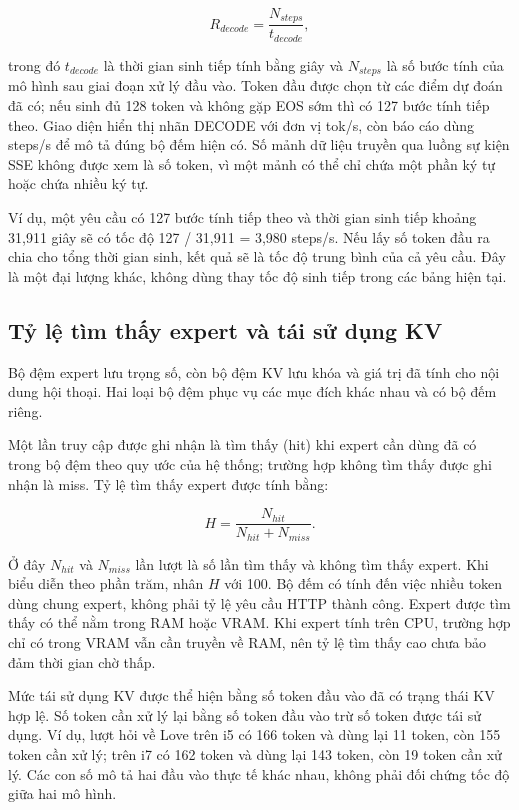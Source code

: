 \begin{equation}
\label{eq:2.11}
R_{decode}=\frac{N_{steps}}{t_{decode}},
\end{equation}

trong đó $t_{decode}$ là thời gian sinh tiếp tính bằng giây và $N_{steps}$ là số bước tính của mô hình sau giai đoạn xử lý đầu vào. Token đầu được chọn từ các điểm dự đoán đã có; nếu sinh đủ 128 token và không gặp EOS sớm thì có 127 bước tính tiếp theo. Giao diện hiển thị nhãn DECODE với đơn vị tok/s, còn báo cáo dùng steps/s để mô tả đúng bộ đếm hiện có. Số mảnh dữ liệu truyền qua luồng sự kiện SSE không được xem là số token, vì một mảnh có thể chỉ chứa một phần ký tự hoặc chứa nhiều ký tự.

Ví dụ, một yêu cầu có 127 bước tính tiếp theo và thời gian sinh tiếp khoảng 31,911 giây sẽ có tốc độ 127 / 31,911 = 3,980 steps/s. Nếu lấy số token đầu ra chia cho tổng thời gian sinh, kết quả sẽ là tốc độ trung bình của cả yêu cầu. Đây là một đại lượng khác, không dùng thay tốc độ sinh tiếp trong các bảng hiện tại.

\subsection{Tỷ lệ tìm thấy expert và tái sử dụng KV}

Bộ đệm expert lưu trọng số, còn bộ đệm KV lưu khóa và giá trị đã tính cho nội dung hội thoại. Hai loại bộ đệm phục vụ các mục đích khác nhau và có bộ đếm riêng.

Một lần truy cập được ghi nhận là tìm thấy (hit) khi expert cần dùng đã có trong bộ đệm theo quy ước của hệ thống; trường hợp không tìm thấy được ghi nhận là miss. Tỷ lệ tìm thấy expert được tính bằng:

\begin{equation}
\label{eq:2.12}
H=\frac{N_{hit}}{N_{hit}+N_{miss}}.
\end{equation}

Ở đây $N_{hit}$ và $N_{miss}$ lần lượt là số lần tìm thấy và không tìm thấy expert. Khi biểu diễn theo phần trăm, nhân $H$ với 100. Bộ đếm có tính đến việc nhiều token dùng chung expert, không phải tỷ lệ yêu cầu HTTP thành công. Expert được tìm thấy có thể nằm trong RAM hoặc VRAM. Khi expert tính trên CPU, trường hợp chỉ có trong VRAM vẫn cần truyền về RAM, nên tỷ lệ tìm thấy cao chưa bảo đảm thời gian chờ thấp.

Mức tái sử dụng KV được thể hiện bằng số token đầu vào đã có trạng thái KV hợp lệ. Số token cần xử lý lại bằng số token đầu vào trừ số token được tái sử dụng. Ví dụ, lượt hỏi về Love trên i5 có 166 token và dùng lại 11 token, còn 155 token cần xử lý; trên i7 có 162 token và dùng lại 143 token, còn 19 token cần xử lý. Các con số mô tả hai đầu vào thực tế khác nhau, không phải đối chứng tốc độ giữa hai mô hình.

